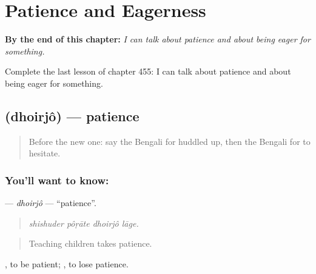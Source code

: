 
\chapter{Patience and Eagerness}
\label{ch:bn-patience-and-eagerness}

\begin{chapteropening}
\textbf{By the end of this chapter:} \emph{I can talk about patience and about being eager for something.}

Complete the last lesson of chapter 455: I can talk about patience and about being eager for something.
\end{chapteropening}

\section[\texorpdfstring{\bn{ধৈর্য} (dhoirjô)}{ধৈর্য (dhoirjô)}]{ (dhoirjô) — patience}

\label{lesson:BN-C455-dhoirjo}



\begin{quote}
Before the new one: say the Bengali for huddled up, then the Bengali for to hesitate.
\end{quote}

\subsection*{You'll want to know: }
\textbf{} — \emph{dhoirjô} — \textquotedblleft{}patience\textquotedblright{}.

\begin{quote}
   
\end{quote}

\begin{quote}
\emph{shishuder pôṛāte dhoirjô lāge.}
\end{quote}

\begin{quote}
Teaching children takes patience.
\end{quote}

 , to be patient;  , to lose patience.

